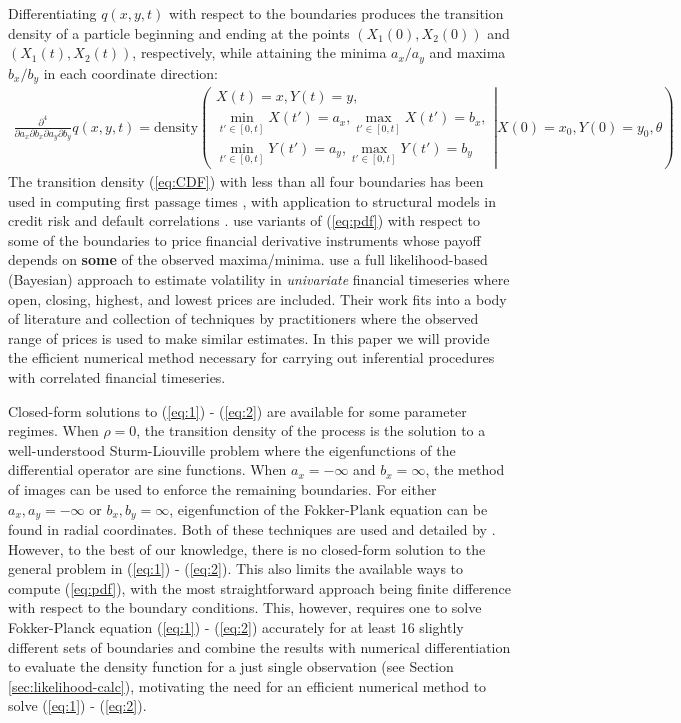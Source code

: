 \documentclass[10pt]{article}
\begin{document}
Differentiating $q(x,y,t)$ with respect to the boundaries produces the
transition density of a particle beginning and ending at the points
$(X_1(0), X_2(0))$ and $(X_1(t), X_2(t))$, respectively, while
attaining the minima $a_x/a_y$ and maxima $b_x/b_y$ in each coordinate
direction:
\begin{align}
  \frac{\partial^4}{\partial a_x \partial b_x \partial a_y \partial b_y} q(x,y,t) = 
\mbox{density} \left( \left. \begin{array}{ll}
X(t) =x, Y(t) =y,  \\
\displaystyle \min_{t'\in[0, t]} X(t') = a_x, \max_{t'\in[0, t]} X(t') = b_x, \\
\displaystyle \min_{t'\in[0, t]} Y(t') = a_y, \max_{t'\in[0, t]} Y(t') = b_y
\end{array} \right | X(0)=x_0, Y(0)=y_0, \theta
\right) \label{eq:pdf}
\end{align}
The transition density (\ref{eq:CDF}) with less than all four
boundaries has been used in computing first passage times
\citep{kou2016first, sacerdote2016first}, with application to
structural models in credit risk and default correlations
\citep{haworth2008modelling, ching2014correlated}. \cite{he1998double}
use variants of (\ref{eq:pdf}) with respect to some of the boundaries
to price financial derivative instruments whose payoff depends on
\textbf{some} of the observed maxima/minima. \cite{rodriguez2012} use
a full likelihood-based (Bayesian) approach to estimate volatility in
\textit{univariate} financial timeseries where open, closing, highest,
and lowest prices are included. Their work fits into a body of
literature and collection of techniques by practitioners where the
observed range of prices is used to make similar estimates. In this
paper we will provide the efficient numerical method necessary for
carrying out inferential procedures with correlated financial
timeseries.

Closed-form solutions to (\ref{eq:1}) - (\ref{eq:2}) are available for
some parameter regimes. When $\rho = 0$, the transition density of the
process is the solution to a well-understood Sturm-Liouville problem
where the eigenfunctions of the differential operator are sine
functions. When $a_x = -\infty$ and $b_x = \infty$, the method of
images can be used to enforce the remaining boundaries. For either
$a_x, a_y = -\infty$ or $b_x, b_y = \infty$, eigenfunction of the
Fokker-Plank equation can be found in radial coordinates. Both of
these techniques are used and detailed by
\cite{he1998double}. However, to the best of our knowledge, there is
no closed-form solution to the general problem in (\ref{eq:1}) -
(\ref{eq:2}). This also limits the available ways to compute
(\ref{eq:pdf}), with the most straightforward approach being finite
difference with respect to the boundary conditions. This, however,
requires one to solve Fokker-Planck equation (\ref{eq:1}) - (\ref{eq:2})
accurately for at least 16 slightly different sets of boundaries and
combine the results with numerical differentiation to evaluate the
density function for a just single observation (see Section
\ref{sec:likelihood-calc}), motivating the need for an efficient
numerical method to solve (\ref{eq:1}) - (\ref{eq:2}).
\end{document}
